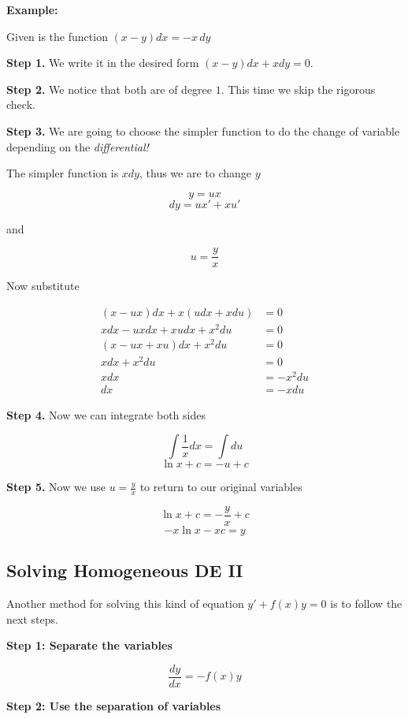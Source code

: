 \textbf{Example:}

Given is the function \((x - y)dx = -x\,dy\)

\textbf{Step 1.} We write it in the desired form \((x - y)dx + xdy = 0\).

\textbf{Step 2.} We notice that both are of degree \(1\). This time we skip the rigorous check.

\textbf{Step 3.} We are going to choose the simpler function to do the change of variable
depending on the \emph{differential!}

The simpler function is \(xdy\), thus we are to change \(y\)

\[
    y = ux
\]
\[
    dy = ux' + xu'
\]

and

\[
    u = \frac{y}{x}
\]

Now substitute

\begin{align*}
    (x - ux)dx + x(udx + xdu)       & = 0         \\
    xdx - u x dx + x u dx + x^{2}du & = 0         \\
    (x - ux + xu)dx + x^{2}du       & = 0         \\
    xdx + x^{2}du                   & = 0         \\
    xdx                             & = - x^{2}du \\
    dx                              & = - xdu
\end{align*}

\textbf{Step 4.} Now we can integrate both sides

\[
    \int \frac{1}{x}dx = \int du
\]
\[
    \ln x + c = -u + c
\]

\textbf{Step 5.} Now we use \(u = \frac{y}{x}\) to return to our original variables

\[
    \ln x + c = -\frac{y}{x} + c
\]
\[
    -x\ln x - xc = y
\]

\subsection{Solving Homogeneous DE II}

Another method for solving this kind of equation \(y' + f(x)y = 0\) is to follow the next steps.

\textbf{Step 1: Separate the variables}

\[
    \frac{dy}{dx} = -f(x)y
\]

\textbf{Step 2: Use the separation of variables}

